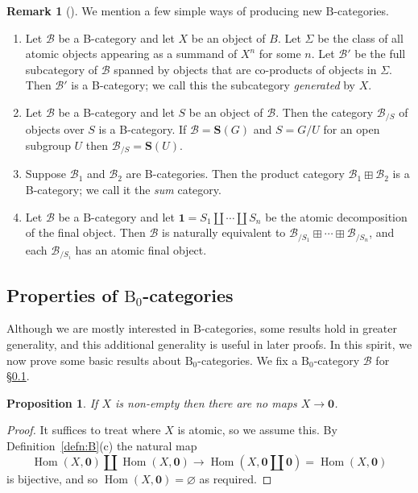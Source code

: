 \documentclass[12pt]{amsart}
\numberwithin{equation}{section}
\newtheorem{proposition}[equation]{Proposition}
\theoremstyle{definition}
\newtheorem{rmk}[equation]{Remark}
\newenvironment{remark}[1][]{\begin{rmk}[#1] \pushQED{\qed}}{\popQED \end{rmk}}
\newcommand{\cB}{\mathcal{B}}
\newcommand{\rB}{\mathrm{B}}
\newcommand{\bS}{\mathbf{S}}
\newcommand{\defn}[1]{\emph{#1}}
\renewcommand{\emptyset}{\varnothing}
\DeclareMathOperator{\Hom}{Hom}
\newcommand{\bzero}{\mathbf{0}}
\newcommand{\bone}{\mathbf{1}}
\begin{document}
\begin{remark}
We mention a few simple ways of producing new $\rB$-categories.
\begin{enumerate}
\item Let $\cB$ be a B-category and let $X$ be an object of $B$. Let $\Sigma$ be the class of all atomic objects appearing as a summand of $X^n$ for some $n$. Let $\cB'$ be the full subcategory of $\cB$ spanned by objects that are co-products of objects in $\Sigma$. Then $\cB'$ is a B-category; we call this the subcategory \defn{generated} by $X$.
\item Let $\cB$ be a B-category and let $S$ be an object of $\cB$. Then the category $\cB_{/S}$ of objects over $S$ is a B-category. If $\cB=\bS(G)$ and $S=G/U$ for an open subgroup $U$ then $\cB_{/S}=\bS(U)$.
\item Suppose $\cB_1$ and $\cB_2$ are B-categories. Then the product category $\cB_1 \boxplus \cB_2$ is a B-category; we call it the \defn{sum} category.
\item Let $\cB$ be a $\rB$-category and let $\bone=S_1 \amalg \cdots \amalg S_n$ be the atomic decomposition of the final object. Then $\cB$ is naturally equivalent to $\cB_{/S_1} \boxplus \cdots \boxplus \cB_{/S_n}$, and each $\cB_{/S_i}$ has an atomic final object. \qedhere
\end{enumerate}
\end{remark}

\subsection{Properties of $\rB_0$-categories} \label{ss:B0-prop}

Although we are mostly interested in $\rB$-categories, some results hold in greater generality, and this additional generality is useful in later proofs. In this spirit, we now prove some basic results about $\rB_0$-categories. We fix a $\rB_0$-category $\cB$ for \S \ref{ss:B0-prop}.

\begin{proposition} \label{prop:map-to-empty}
If $X$ is non-empty then there are no maps $X \to \bzero$.
\end{proposition}

\begin{proof}
It suffices to treat where $X$ is atomic, so we assume this. By Definition~\ref{defn:B}(c) the natural map
\begin{displaymath}
\Hom(X, \bzero) \amalg \Hom(X, \bzero) \to \Hom(X, \bzero \amalg \bzero)=\Hom(X, \bzero)
\end{displaymath}
is bijective, and so $\Hom(X, \bzero)=\emptyset$ as required.
\end{proof}
\end{document}
